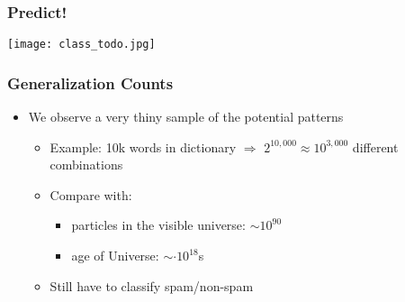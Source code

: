 \documentclass[mathserif, xcolor=table, svgnames]{beamer}
\begin{document}
\begin{frame}
  \frametitle{Predict!}
  \texttt{[image: class\_todo.jpg]}
\end{frame}

\begin{frame}
  \frametitle{Generalization Counts}
  \begin{itemize}
  \item We observe a very thiny sample of the potential patterns
    \begin{itemize}
    \item Example: 10k words in dictionary $\Rightarrow$
      $2^{10,000} \approx 10^{3,000}$ different combinations
    \item Compare with:
      \begin{itemize}
      \item particles in the visible universe: $\sim 10^{90}$ 
      \item  age of Universe: $\sim \cdot 10^{18}$s
      \end{itemize}
    \item Still have to classify spam/non-spam
    \end{itemize}
  \end{itemize}
\end{frame}
\end{document}
